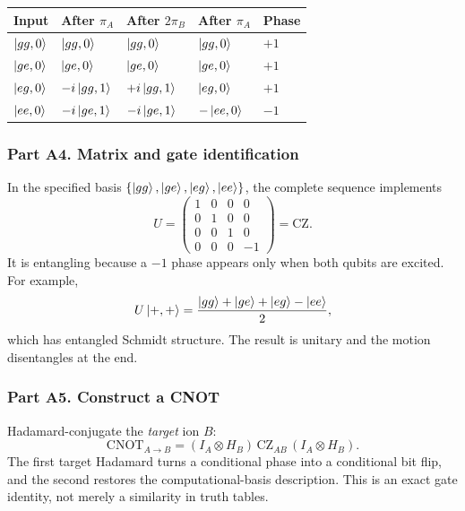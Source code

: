 \begin{center}\small
\renewcommand{\arraystretch}{1.25}
\begin{tabular}{@{}lllll@{}}\toprule
Input&After $\pi_A$&After $2\pi_B$&After $\pi_A$&Phase\\\midrule
$\left\lvert gg,0\right\rangle$&$\left\lvert gg,0\right\rangle$&$\left\lvert gg,0\right\rangle$&$\left\lvert gg,0\right\rangle$&$+1$\\
$\left\lvert ge,0\right\rangle$&$\left\lvert ge,0\right\rangle$&$\left\lvert ge,0\right\rangle$&$\left\lvert ge,0\right\rangle$&$+1$\\
$\left\lvert eg,0\right\rangle$&$-i\left\lvert gg,1\right\rangle$&$+i\left\lvert gg,1\right\rangle$&$\left\lvert eg,0\right\rangle$&$+1$\\
$\left\lvert ee,0\right\rangle$&$-i\left\lvert ge,1\right\rangle$&$-i\left\lvert ge,1\right\rangle$&$-\left\lvert ee,0\right\rangle$&$-1$\\\bottomrule
\end{tabular}\end{center}

\subsubsection*{Part A4. Matrix and gate identification}
In the specified basis $\{\left\lvert gg\right\rangle,\left\lvert ge\right\rangle,\left\lvert eg\right\rangle,\left\lvert ee\right\rangle\}$, the complete sequence implements
\begin{equation}\boxed{U=\begin{pmatrix}1&0&0&0\\0&1&0&0\\0&0&1&0\\0&0&0&-1\end{pmatrix}=\mathrm{CZ}.}\end{equation}
It is entangling because a $-1$ phase appears only when both qubits are excited. For example,
\begin{equation}U\left\lvert +,+\right\rangle=\frac{\left\lvert gg\right\rangle+\left\lvert ge\right\rangle+\left\lvert eg\right\rangle-\left\lvert ee\right\rangle}2,\end{equation}
which has entangled Schmidt structure. The result is unitary and the motion disentangles at the end.

\subsubsection*{Part A5. Construct a CNOT}
Hadamard-conjugate the \emph{target} ion $B$:
\begin{equation}\boxed{\mathrm{CNOT}_{A\to B}=(I_A\otimes H_B)\,\mathrm{CZ}_{AB}\,(I_A\otimes H_B).}\end{equation}
The first target Hadamard turns a conditional phase into a conditional bit flip, and the second restores the computational-basis description. This is an exact gate identity, not merely a similarity in truth tables.

